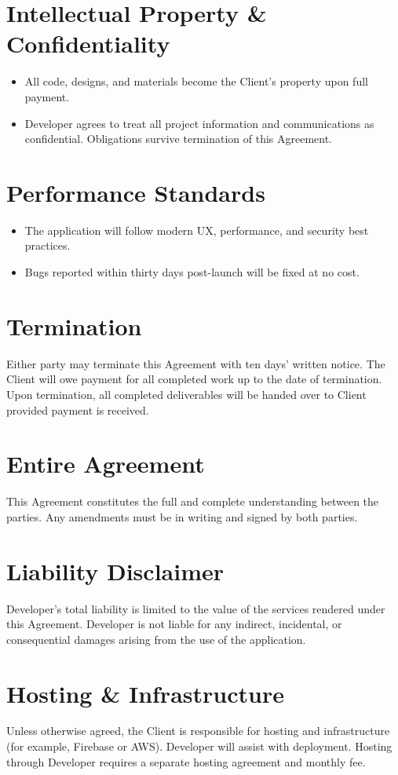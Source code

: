 \documentclass[11pt,letterpaper]{article}
\begin{document}
\section{Intellectual Property \& Confidentiality}
\begin{itemize}[leftmargin=*]
\item All code, designs, and materials become the Client's property upon full payment.
\item Developer agrees to treat all project information and communications as confidential. Obligations survive termination of this Agreement.
\end{itemize}

\section{Performance Standards}
\begin{itemize}[leftmargin=*]
\item The application will follow modern UX, performance, and security best practices.
\item Bugs reported within thirty days post-launch will be fixed at no cost.
\end{itemize}

\section{Termination}
Either party may terminate this Agreement with ten days' written notice. The Client will owe payment for all completed work up to the date of termination. Upon termination, all completed deliverables will be handed over to Client provided payment is received.

\section{Entire Agreement}
This Agreement constitutes the full and complete understanding between the parties. Any amendments must be in writing and signed by both parties.

\section{Liability Disclaimer}
Developer's total liability is limited to the value of the services rendered under this Agreement. Developer is not liable for any indirect, incidental, or consequential damages arising from the use of the application.

\section{Hosting \& Infrastructure}
Unless otherwise agreed, the Client is responsible for hosting and infrastructure (for example, Firebase or AWS). Developer will assist with deployment. Hosting through Developer requires a separate hosting agreement and monthly fee.
\end{document}
